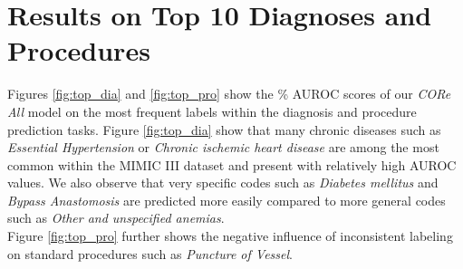 \documentclass[11pt,a4paper]{article}
\begin{document}
\section{Results on Top 10 Diagnoses and Procedures}
Figures \ref{fig:top_dia} and \ref{fig:top_pro} show the \% AUROC scores of our \textit{CORe All} model on the most frequent labels within the diagnosis and procedure prediction tasks. Figure \ref{fig:top_dia} show that many chronic diseases such as \textit{Essential Hypertension} or \textit{Chronic ischemic heart disease} are among the most common within the MIMIC III dataset and present with relatively high AUROC values. We also observe that very specific codes such as \textit{Diabetes mellitus} and \textit{Bypass Anastomosis} are predicted more easily compared to more general codes such as \textit{Other and unspecified anemias}.\\
Figure \ref{fig:top_pro} further shows the negative influence of inconsistent labeling on standard procedures such as \textit{Puncture of Vessel}.  
\end{document}

